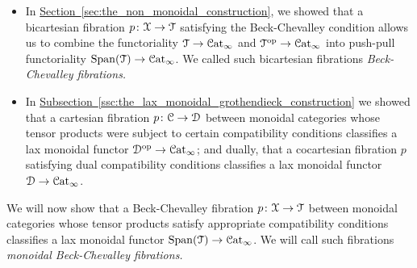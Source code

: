 \documentclass[main.tex]{subfiles}
\begin{document}
\begin{itemize}
  \item In \hyperref[sec:the_non_monoidal_construction]{Section~\ref*{sec:the_non_monoidal_construction}}, we showed that a bicartesian fibration $p\colon \mathcal{X} \to \mathcal{T}$ satisfying the Beck-Chevalley condition allows us to combine the functoriality $\mathcal{T} \to \mathcal{C}\mathrm{at}_{\infty}$ and $\mathcal{T}^{\mathrm{op}} \to \mathcal{C}\mathrm{at}_{\infty}$ into push-pull functoriality $\mathrm{Span}(\mathcal{T}) \to \mathcal{C}\mathrm{at}_{\infty}$. We called such bicartesian fibrations \emph{Beck-Chevalley fibrations.}

  \item In \hyperref[ssc:the_lax_monoidal_grothendieck_construction]{Subsection~\ref*{ssc:the_lax_monoidal_grothendieck_construction}} we showed that a cartesian fibration $p\colon \mathcal{C} \to \mathcal{D}$ between monoidal categories whose tensor products were subject to certain compatibility conditions classifies a lax monoidal functor $\mathcal{D}^{\mathrm{op}} \to \mathcal{C}\mathrm{at}_{\infty}$; and dually, that a cocartesian fibration $p$ satisfying dual compatibility conditions classifies a lax monoidal functor $\mathcal{D} \to \mathcal{C}\mathrm{at}_{\infty}$.
\end{itemize}

We will now show that a Beck-Chevalley fibration $p\colon \mathcal{X} \to \mathcal{T}$ between monoidal categories whose tensor products satisfy appropriate compatibility conditions classifies a lax monoidal functor $\mathrm{Span}(\mathcal{T}) \to \mathcal{C}\mathrm{at}_{\infty}$. We will call such fibrations \emph{monoidal Beck-Chevalley fibrations.}
\end{document}
